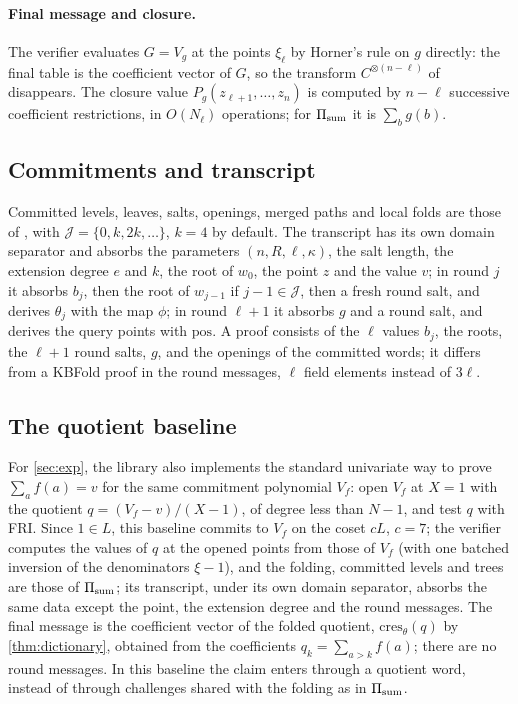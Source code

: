 \paragraph{Final message and closure.}
The verifier evaluates $G = V_g$ at the points $\xi_\ell$ by Horner's rule on $g$ directly: the final table is the coefficient vector of $G$, so the transform $C^{\otimes(n-\ell)}$ of  disappears.
The closure value $P_g(z_{\ell+1},\dots,z_n)$ is computed by $n - \ell$ successive coefficient restrictions, in $O(N_\ell)$ operations; for $\Pi_{\mathrm{sum}}$ it is $\sum_b g(b)$.

\subsection{Commitments and transcript}\label{sec:impl:merkle}

Committed levels, leaves, salts, openings, merged paths and local folds are those of , with $\mathcal{J} = \{0, k, 2k, \dots\}$, $k = 4$ by default.
The transcript has its own domain separator and absorbs the parameters $(n, R, \ell, \kappa)$, the salt length, the extension degree $e$ and $k$, the root of $w_0$, the point $z$ and the value $v$; in round $j$ it absorbs $b_j$, then the root of $w_{j-1}$ if $j-1 \in \mathcal{J}$, then a fresh round salt, and derives $\theta_j$ with the map $\phi$; in round $\ell+1$ it absorbs $g$ and a round salt, and derives the query points with $\mathrm{pos}$.
A proof consists of the $\ell$ values $b_j$, the roots, the $\ell+1$ round salts, $g$, and the openings of the committed words; it differs from a KBFold proof in the round messages, $\ell$ field elements instead of $3\ell$.

\subsection{The quotient baseline}\label{sec:impl:quotient}

For \cref{sec:exp}, the library also implements the standard univariate way to prove $\sum_a f(a) = v$ for the same commitment polynomial $V_f$: open $V_f$ at $X = 1$ with the quotient $q = (V_f - v)/(X-1)$, of degree less than $N - 1$, and test $q$ with FRI.
Since $1 \in L$, this baseline commits to $V_f$ on the coset $cL$, $c = 7$; the verifier computes the values of $q$ at the opened points from those of $V_f$ (with one batched inversion of the denominators $\xi - 1$), and the folding, committed levels and trees are those of $\Pi_{\mathrm{sum}}$; its transcript, under its own domain separator, absorbs the same data except the point, the extension degree and the round messages.
The final message is the coefficient vector of the folded quotient, $\mathrm{cres}_\theta(q)$ by \cref{thm:dictionary}, obtained from the coefficients $q_k = \sum_{a > k} f(a)$; there are no round messages.
In this baseline the claim enters through a quotient word, instead of through challenges shared with the folding as in $\Pi_{\mathrm{sum}}$.

